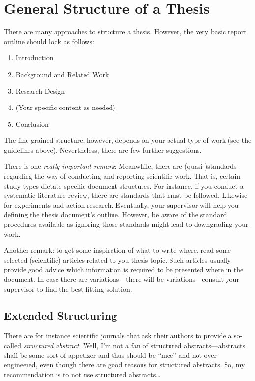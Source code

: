 \section{General Structure of a Thesis}
\label{sec:03:ThesisStructure}
There are many approaches to structure a thesis. However, the very basic report outline should look as follows:
\begin{enumerate}
	\item Introduction
	\item Background and Related Work
	\item Research Design
	\item (Your specific content as needed)
	\item Conclusion
\end{enumerate}
The fine-grained structure, however, depends on your actual type of work (see the guidelines above). Nevertheless, there are few further suggestions.

\begin{MySugg}
	There is one \emph{really important remark}: Meanwhile, there are (quasi-)standards regarding the way of conducting and reporting scientific work. That is, certain study types dictate specific document structures. For instance, if you conduct a systematic literature review, there are standards that must be followed. Likewise for experiments and action research. Eventually, your supervisor will help you defining the thesis document's outline. However, be aware of the standard procedures available as ignoring those standards might lead to downgrading your work.
\end{MySugg}

\begin{MySugg}
	Another remark: to get some inspiration of what to write where, read some selected (scientific) articles related to you thesis topic. Such articles usually provide good advice which information is required to be presented where in the document. In case there are variations---there will be variations---consult your supervisor to find the best-fitting solution.
\end{MySugg}

\subsection{Extended Structuring}
\label{sec:03:ThesisStructure:ExtendedStructuring}
There are for instance scientific journals that ask their authors to provide a so-called \emph{structured abstract}. Well, I'm not a fan of structured abstracts---abstracts shall be some sort of appetizer and thus should be ``nice'' and not over-engineered, even though there are good reasons for structured abstracts. So, my recommendation is to not use structured abstracts\ldots

